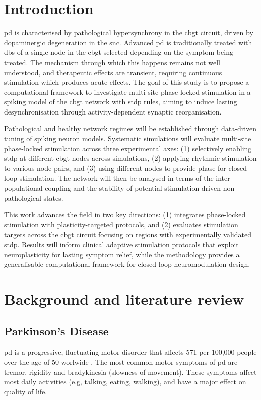 \newpage
{}
\setcounter{page}{1}

\section{Introduction}
\acrfull{pd} is characterised by pathological hypersynchrony in the \acrfull{cbgt} circuit, driven by
dopaminergic degeneration in the \acrfull{snc}.
Advanced \acrshort{pd} is traditionally treated with \acrfull{dbs} of a single node in the \acrshort{cbgt} selected depending
on the symptom being treated.
The mechanism through which this happens remains not well understood, and therapeutic effects are transient,
requiring continuous stimulation which produces acute effects.
The goal of this study is to propose a computational framework to investigate multi-site phase-locked stimulation in a
spiking model of the \acrshort{cbgt} network with \acrfull{stdp} rules, aiming to induce lasting desynchronisation
through activity-dependent synaptic reorganisation.

Pathological and healthy network regimes will be established through data-driven tuning of spiking
neuron models.
Systematic simulations will evaluate multi-site phase-locked stimulation across three experimental axes:
(1) selectively enabling \acrshort{stdp} at different \acrshort{cbgt} nodes across simulations,
(2) applying rhythmic stimulation to various node pairs, and
(3) using different nodes to provide phase for closed-loop stimulation.
The network will then be analysed in terms of the inter-populational coupling and the stability of potential
stimulation-driven non-pathological states.

This work advances the field in two key directions:
(1) integrates phase-locked stimulation with plasticity-targeted protocols, and
(2) evaluates stimulation targets across the \acrshort{cbgt} circuit focusing on regions with experimentally validated \acrshort{stdp}.
Results will inform clinical adaptive stimulation protocols that exploit neuroplasticity for lasting symptom relief,
while the methodology provides a generalisable computational framework for closed-loop neuromodulation design.

\section{Background and literature review}

\subsection{Parkinson's Disease}
\acrshort{pd} is a progressive, fluctuating motor disorder that affects 571 per 100,000 people over the age of 50 worlwide
\cite{pringsheim2014prevalence}.
The most common motor symptoms of \acrshort{pd} are tremor, rigidity and bradykinesia (slowness of movement). These symptoms affect most
daily activities (e.g, talking, eating, walking), and have a major effect on quality of life.

